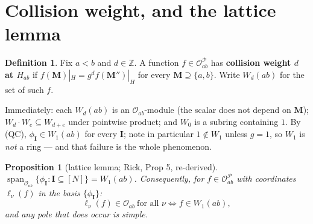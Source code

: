 \documentclass[11pt]{article}
\theoremstyle{plain}
\newtheorem{prop}[thm]{Proposition}
\theoremstyle{definition}
\newtheorem{defn}[thm]{Definition}
\theoremstyle{remark}
\theoremstyle{plain}
\newcommand{\bI}{\mathbf{I}}
\newcommand{\bM}{\mathbf{M}}
\begin{document}
\section{Collision weight, and the lattice lemma}
\label{sec:weight}

\begin{defn}\label{def:weight}
Fix $a<b$ and $d\in\mathbb{Z}$.  A function $f\in\mathcal{O}_{ab}^{\mathcal{P}}$
has \textbf{collision weight $d$ at $H_{ab}$} if
$f(\bM)|_{H}=g^{d}f(\bM'')|_{H}$ for every $\bM\supseteq\{a,b\}$.  Write
$W_d(ab)$ for the set of such $f$.
\end{defn}

\noindent
Immediately: each $W_d(ab)$ is an $\mathcal{O}_{ab}$-module (the scalar does not
depend on $\bM$); $W_d\cdot W_e\subseteq W_{d+e}$ under pointwise product; and
$W_0$ is a subring containing $1$.  By (QC), $\phi_{\bI}\in W_1(ab)$ for every
$\bI$; note in particular $1\notin W_1$ unless $g=1$, so $W_1$ is \emph{not} a
ring --- and that failure is the whole phenomenon.

\begin{prop}[lattice lemma; Rick, Prop 5, re-derived]\label{prop:lattice}
$\operatorname{span}_{\mathcal{O}_{ab}}\{\phi_{\bI}:\bI\subseteq[N]\}=W_1(ab)$.
Consequently, for $f\in\mathcal{O}_{ab}^{\mathcal{P}}$ with coordinates
$\ell_\nu(f)$ in the basis $\{\phi_{\bI}\}$:
\[
  \ell_\nu(f)\in\mathcal{O}_{ab}\ \text{for all }\nu
  \iff f\in W_1(ab),
\]
and any pole that does occur is simple.
\end{prop}
\end{document}
